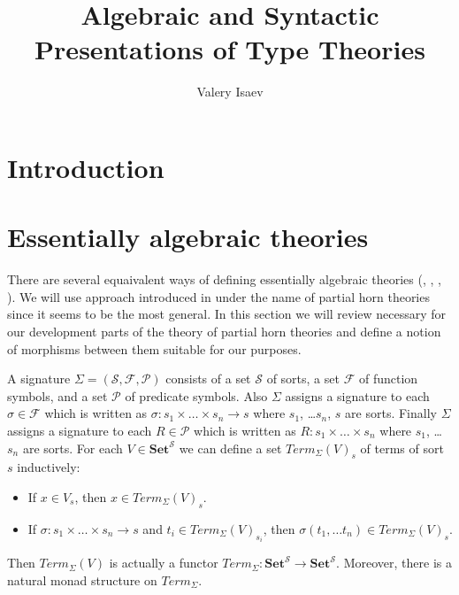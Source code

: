 \documentclass{amsart}
\theoremstyle{definition}
\theoremstyle{remark}
\newcommand{\cat}[1]{\mathbf{#1}}
\newcommand{\Set}{\cat{Set}}
\numberwithin{figure}{section}
\begin{document}
\title{Algebraic and Syntactic Presentations of Type Theories}

\author{Valery Isaev}


\maketitle

\section{Introduction}

\begin{comment}
\section{Contextual categories}

Contextual categories were defined by Cartmell \cite{GAT}.
An equivalent definition was given by Voevodsky in \cite{c-systems}.
In this section we will give another equivalent definition which is just a description of models of the initial algebraic type theory as we will see later.
\end{comment}

\section{Essentially algebraic theories}

There are several equaivalent ways of defining essentially algebraic theories (\cite{LPC}, \cite{GAT}, \cite{PHT}, \cite[D 1.3.4]{elephant}).
We will use approach introduced in \cite{PHT} under the name of partial horn theories since it seems to be the most general.
In this section we will review necessary for our development parts of the theory of partial horn theories and define a notion of morphisms between them suitable for our purposes.

A signature $\Sigma = (\mathcal{S}, \mathcal{F}, \mathcal{P})$ consists of a set $\mathcal{S}$ of sorts, a set $\mathcal{F}$ of function symbols, and a set $\mathcal{P}$ of predicate symbols.
Also $\Sigma$ assigns a signature to each $\sigma \in \mathcal{F}$ which is written as $\sigma : s_1 \times \ldots \times s_n \to s$ where $s_1$, \ldots $s_n$, $s$ are sorts.
Finally $\Sigma$ assigns a signature to each $R \in \mathcal{P}$ which is written as $R : s_1 \times \ldots \times s_n$ where $s_1$, \ldots $s_n$ are sorts.
For each $V \in \Set^\mathcal{S}$ we can define a set $Term_\Sigma(V)_s$ of terms of sort $s$ inductively:
\begin{itemize}
\item If $x \in V_s$, then $x \in Term_\Sigma(V)_s$.
\item If $\sigma : s_1 \times \ldots \times s_n \to s$ and $t_i \in Term_\Sigma(V)_{s_i}$, then $\sigma(t_1, \ldots t_n) \in Term_\Sigma(V)_s$.
\end{itemize}
Then $Term_\Sigma(V)$ is actually a functor $Term_\Sigma : \Set^\mathcal{S} \to \Set^\mathcal{S}$.
Moreover, there is a natural monad structure on $Term_\Sigma$.
\end{document}
